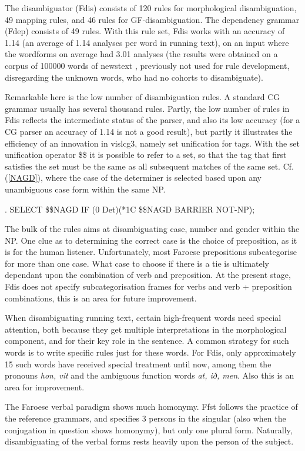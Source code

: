 \documentclass[11pt]{article}
\begin{document}
The disambiguator (Fdis) consists of 120 rules for morphological disambiguation, 49 mapping rules, and 46 rules for GF-disambiguation. The dependency grammar (Fdep) consists of 49 rules. With this rule set, Fdis works with an accuracy of 1.14 (an average of 1.14 analyses per word in running text), on an input where the wordforms on average had 3.01 analyses (the results were obtained on a corpus of 100000 words of newstext , previously not used for rule development, disregarding the unknown words, who had no cohorts to disambiguate).

Remarkable here is the low number of disambiguation rules. A standard CG grammar usually has several thousand rules. Partly, the low number of rules in Fdis reflects the intermediate status of the parser, and also its low accuracy (for a CG parser an accuracy of 1.14 is not a good result), but partly it illustrates the efficiency of an innovation in vislcg3, namely set unification for tags. With the set unification operator \$\$ it is possible to refer to a set, so that the tag that first satisfies the set must be the same as all subsequent matches of the same set. Cf. (\ref{NAGD}), where the case of the determiner is selected based upon any unambiguous case form within the same NP.

\ex.\label{NAGD} \small{SELECT \$\$NAGD IF (0 Det)(*1C \$\$NAGD BARRIER NOT-NP);}

The bulk of the rules aims at disambiguating case, number and gender within the NP. One clue as to determining the correct case is the choice of preposition, as it is for the human listener. Unfortunately, most Faroese prepositions subcategorise for more than one case. What case to choose if there is a tie is ultimately dependant upon the combination of verb and preposition. At the present stage, Fdis does not specify subcategorisation frames for verbs and verb + preposition combinations, this is an area for future improvement.

When disambiguating running text, certain high-frequent words need special attention, both because they get multiple interpretations in the morphological component, and for their key role in the sentence. A common strategy for such words is to write specific rules just for these words. For Fdis, only approximately 15 such words have received special treatment until now, among them the pronouns \textit{hon, vit} and the ambiguous function words \textit{at, ið, men}. Also this is an area for improvement.

The Faroese verbal paradigm shows much homonymy. Ffst follows the practice of the reference grammars, and specifies 3 persons in the singular (also when the conjugation in question shows homonymy), but only one plural form. Naturally, disambiguating of the verbal forms rests heavily upon the person of the subject. 
\end{document}
